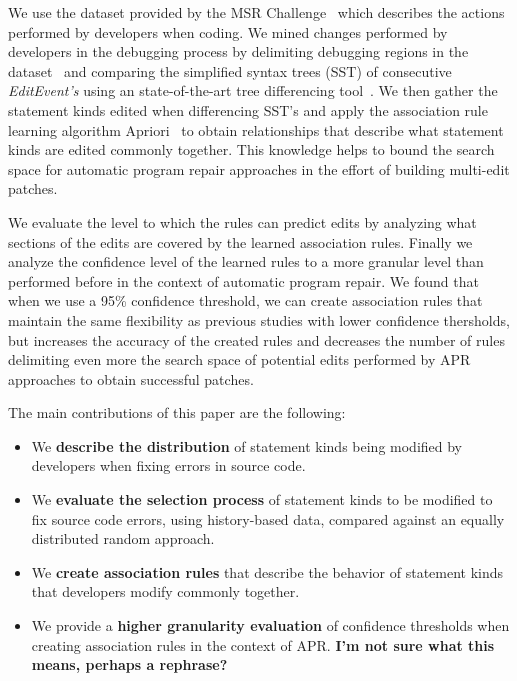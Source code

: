 \documentclass[sigconf]{acmart}
\newcommand{\todo}[1]
  {{\scriptsize \textbf{\color{red} {#1}}}}
\begin{document}
We use the dataset provided by the MSR Challenge~\cite{msr18challenge}
which describes the actions performed
by developers when coding.
We mined changes performed by developers in the debugging
process by delimiting debugging regions in the 
dataset~\cite{msr18challenge} and comparing the simplified syntax
trees (SST) of consecutive \textit{EditEvent's} using an 
state-of-the-art tree differencing tool~\cite{Pawlik16Apted}.
We then gather the statement kinds edited when
differencing SST's and apply the association
rule learning algorithm Apriori~\cite{Agrawal94}
to obtain relationships that describe what statement kinds
are edited commonly together. This knowledge helps to 
bound the search space for automatic program repair approaches
in the effort of building multi-edit patches.

We evaluate the level to which the rules can predict edits
by analyzing what sections of the edits are covered by the 
learned association rules. 
Finally we analyze
the confidence level of the learned rules to a more granular 
level than performed before in the context of automatic
program repair. We found that when we use a 95\% confidence
threshold, we can create association
rules that maintain the same flexibility as previous
studies with lower confidence thersholds\cite{Soto18}, but increases
the accuracy of the created rules and decreases the number of rules
delimiting even more the search space of potential edits
performed by APR approaches to obtain successful patches.

The main contributions of this paper are the following:
\begin{itemize}
\item We \textbf{describe the distribution} of statement kinds being
modified by developers when fixing errors in source code. 

\item We \textbf{evaluate
the selection process} of statement kinds to be modified
to fix source code errors, using history-based data, compared against
an equally distributed random approach.

\item We \textbf{create association rules} that describe the behavior
of statement kinds that developers modify commonly together.

\item We provide a \textbf{higher granularity evaluation} 
of confidence thresholds when creating
association rules in the context of APR.\todo{I'm not sure what this means,
  perhaps a rephrase?}

\end{itemize}
\end{document}
